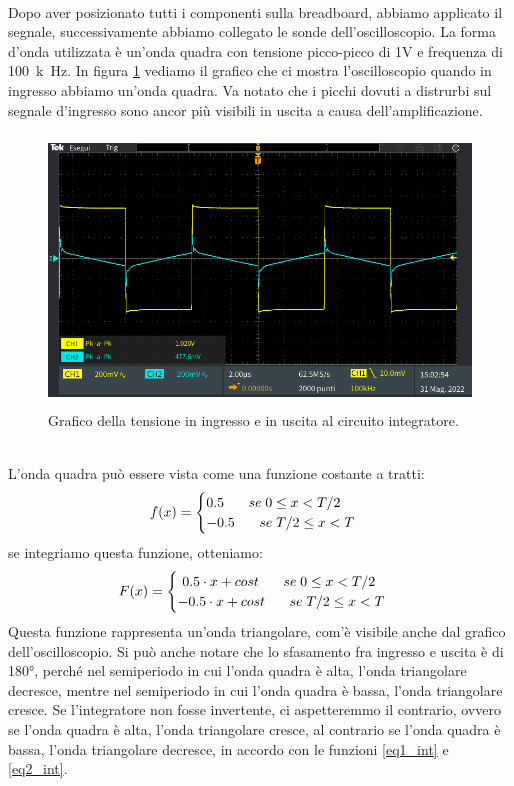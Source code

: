 \documentclass{report}
\begin{document}
\\\indent Dopo aver posizionato tutti i componenti sulla breadboard, abbiamo applicato il segnale, successivamente abbiamo collegato le sonde dell'oscilloscopio. La forma d'onda utilizzata è un'onda quadra con tensione picco-picco di 1V e frequenza di \SI{100}{k\hertz}. In figura \ref{figura:oscillo15} vediamo il grafico che ci mostra l'oscilloscopio quando in ingresso abbiamo un'onda quadra. Va notato che i picchi dovuti a distrurbi sul segnale d'ingresso sono ancor più visibili in uscita a causa dell'amplificazione. 
\begin{figure}[h!]
\centering
\includegraphics[height=7.2cm]{immagini/oscillo15}
\caption{Grafico della tensione in ingresso e in uscita al circuito integratore.}
\label{figura:oscillo15}
\end{figure}
\\L'onda quadra può essere vista come una funzione costante a tratti:
\begin{equation}
	f(x)=\label{eq1_int}
	\begin{cases}
		0.5\indent\;se\;0\le x<T/2 \\
		-0.5\indent\;se\;T/2\le x<T 
	\end{cases}
\end{equation}
se integriamo questa funzione, otteniamo:
\begin{equation}
	F(x)=\label{eq2_int}
	\begin{cases}
		~0.5\cdot x + cost\indent\;se\;0\le x<T/2 \\
		-0.5\cdot x + cost\indent\;se\;T/2\le x<T 
	\end{cases}
\end{equation}
Questa funzione rappresenta un'onda triangolare, com'è visibile anche dal grafico dell'oscilloscopio. Si può anche notare che lo sfasamento fra ingresso e uscita è di 180°, perché nel semiperiodo in cui l'onda quadra è alta, l'onda triangolare decresce, mentre nel semiperiodo in cui l'onda quadra è bassa, l'onda triangolare cresce. Se l'integratore non fosse invertente, ci aspetteremmo il contrario, ovvero se l'onda quadra è alta, l'onda triangolare cresce, al contrario se l'onda quadra è bassa, l'onda triangolare decresce, in accordo con le funzioni \eqref{eq1_int} e \eqref{eq2_int}.


\end{document}
